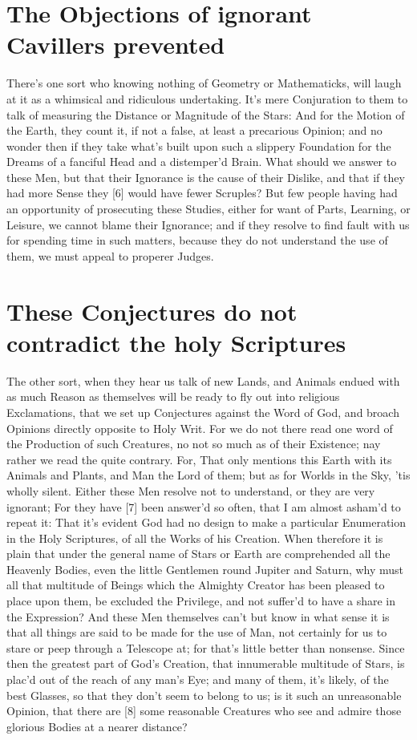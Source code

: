 \documentclass[letterpaper]{book}
\begin{document}
\section{The Objections of ignorant Cavillers prevented}

There's one sort who knowing nothing of Geometry or Mathematicks, will laugh
at it as a whimsical and ridiculous undertaking. It's mere Conjuration to
them to talk of measuring the Distance or Magnitude of the Stars: And for
the Motion of the Earth, they count it, if not a false, at least a
precarious Opinion; and no wonder then if they take what's built upon such a
slippery Foundation for the Dreams of a fanciful Head and a distemper'd
Brain.  What should we answer to these Men, but that their Ignorance is the
cause of their Dislike, and that if they had more Sense they [6] would have
fewer Scruples? But few people having had an opportunity of prosecuting
these Studies, either for want of Parts, Learning, or Leisure, we cannot
blame their Ignorance; and if they resolve to find fault with us for
spending time in such matters, because they do not understand the use of
them, we must appeal to properer Judges.


\section{These Conjectures do not contradict the holy Scriptures}

The other sort, when they hear us talk of new Lands, and Animals endued with
as much Reason as themselves will be ready to fly out into religious
Exclamations, that we set up Conjectures against the Word of God, and broach
Opinions directly opposite to Holy Writ. For we do not there read one word
of the Production of such Creatures, no not so much as of their Existence;
nay rather we read the quite contrary. For, That only mentions this Earth
with its Animals and Plants, and Man the Lord of them; but as for Worlds in
the Sky, 'tis wholly silent. Either these Men resolve not to understand, or
they are very ignorant; For they have [7] been answer'd so often, that I am
almost asham'd to repeat it: That it's evident God had no design to make a
particular Enumeration in the Holy Scriptures, of all the Works of his
Creation. When therefore it is plain that under the general name of Stars or
Earth are comprehended all the Heavenly Bodies, even the little Gentlemen
round Jupiter and Saturn, why must all that multitude of Beings which the
Almighty Creator has been pleased to place upon them, be excluded the
Privilege, and not suffer'd to have a share in the Expression?  And these
Men themselves can't but know in what sense it is that all things are said
to be made for the use of Man, not certainly for us to stare or peep through a
Telescope at; for that's little better than nonsense. Since then the
greatest part of God's Creation, that innumerable multitude of Stars, is
plac'd out of the reach of any man's Eye; and many of them, it's likely, of
the best Glasses, so that they don't seem to belong to us; is it such an
unreasonable Opinion, that there are [8] some reasonable Creatures who see
and admire those glorious Bodies at a nearer distance?
\end{document}
